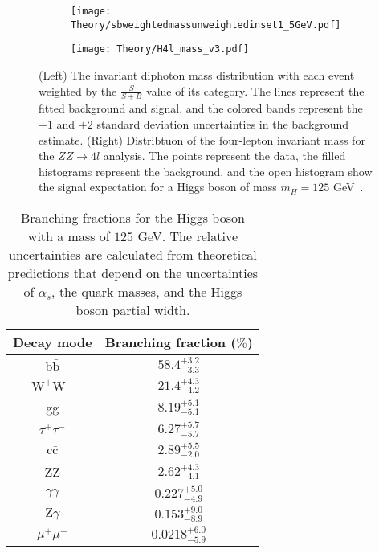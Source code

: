 \begin{figure}[h!]
 
\begin{subfigure}{0.5\textwidth}
\texttt{[image: Theory/sbweightedmassunweightedinset1\_5GeV.pdf]} 
\end{subfigure}
\begin{subfigure}{0.5\textwidth}
\texttt{[image: Theory/H4l\_mass\_v3.pdf]}
\end{subfigure}
 
\caption{(Left) The invariant diphoton mass distribution with each event weighted by the $\frac{S}{S+B}$ value of its category. The lines represent the fitted background and signal, and the colored bands represent the $\pm1$ and $\pm2$ standard deviation uncertainties in the background estimate. (Right) Distribtuon of the four-lepton invariant mass for the $ZZ\rightarrow 4l$ analysis. The points represent the data, the filled histograms represent the background, and the open histogram show the signal expectation for a Higgs boson of mass $m_{H}=125$ GeV~\cite{CMSHiggs}.}
\label{fig:HiggsMeasurement}
\end{figure}

{\renewcommand{\arraystretch}{1.5}
\begin{table}[h!]
\begin{center}
    \begin{tabular}{c c}
    \hline
    \hline
    Decay mode &  Branching fraction ($\%$) \\
    \hline
    $\mathrm{b\bar{b}}$ &  $58.4^{+3.2}_{-3.3}$\\
    $\mathrm{W^{+}W^{-}}$ & $21.4^{+4.3}_{-4.2}$ \\
    gg & $8.19^{+5.1}_{-5.1}$ \\
    $\tau^{+}\tau^{-}$ & $6.27^{+5.7}_{-5.7}$  \\
    $\mathrm{c\bar{c}}$ & $2.89^{+5.5}_{-2.0}$ \\
    ZZ & $2.62^{+4.3}_{-4.1}$ \\
    $\gamma\gamma$ & $0.227^{+5.0}_{-4.9}$ \\
    $\mathrm{Z}\gamma$ & $0.153^{+9.0}_{-8.9}$ \\
    $\mu^{+}\mu^{-}$ & $0.0218^{+6.0}_{-5.9}$ \\
    \hline
    \hline
    \end{tabular}
    \caption{Branching fractions for the Higgs boson with a mass of $125$ GeV. The relative uncertainties are calculated from theoretical predictions that depend on the uncertainties of $\alpha_{s}$, the quark masses, and the Higgs boson partial width.}\label{tab:HiggsBR}
\end{center}
\end{table}}


